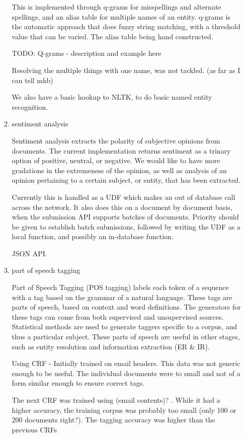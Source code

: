\documentclass{article}
\begin{document}
\begin{enumerate}
\begin{enumerate}
    This is implemented through q-grams for misspellings and alternate spellings,
    and an alias table for multiple names of an entity.
    q-grams is the automatic approach that does fuzzy string matching,
    with a threshold value that can be varied.
    The alias table being hand constructed.

    TODO: Q-grams - description and example here

    Resolving the multiple things with one name, was not tackled. (as far as I can tell mhb)

    We also have a basic hookup to NLTK, to do basic named entity recognition.

  \item sentiment analysis

    Sentiment analysis extracts the polarity of subjective opinions from documents.
    The current implementation returns sentiment as a trinary option of positive, neutral, or negative.
    We would like to have more gradations in the extremeness of the opinion,
    as well as analysis of an opinion pertaining to a certain subject, or entity, that has been extracted.

    Currently this is handled as a UDF which makes an out of database call across the network.
    It also does this on a document by document basis,
    when the submission API supports batches of documents.
    Priority should be given to establish batch submissions,
    followed by writing the UDF as a local function,
    and possibly an in-database function.

    JSON API.


  \item part of speech tagging

    Part of Speech Tagging (POS tagging) labels each token of a sequence with a tag based on the grammar of a natural language.
    These tags are parts of speech, based on context and word definitions.
    The generators for these tags can come from both supervised and unsupervised sources.
    Statistical methods are used to generate taggers specific to a corpus, and thus a particular subject.
    These parts of speech are useful in other stages, such as entity resolution and information extraction (ER \& IR).

    Using CRF -
    Initially trained on email headers.
    This data was not generic enough to be useful.
    The individual documents were to small and not of a form similar enough to ensure correct tags.

    The next CRF was trained using (email contents)? .
    While it had a higher accuracy, the training corpus was probably too small (only 100 or 200 documents right?).
    The tagging accuracy was higher than the previous CRFs


\end{enumerate}
\end{enumerate}
\end{document}
